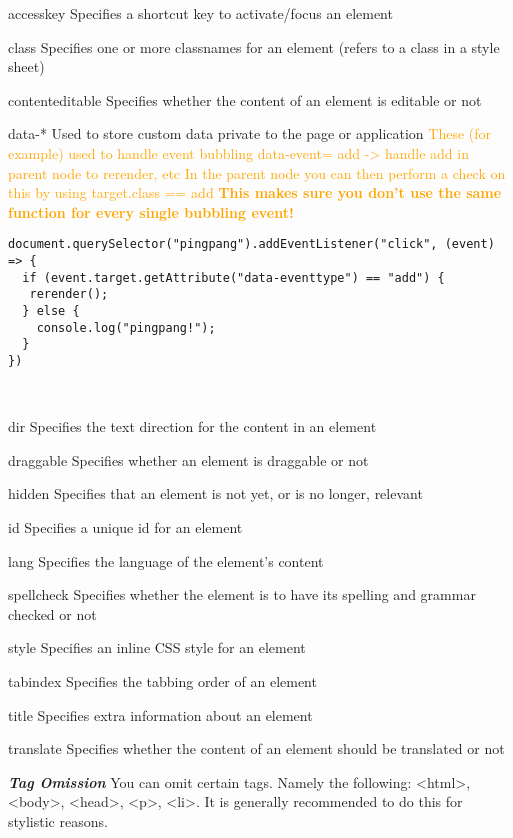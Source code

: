 \documentclass[main.tex,fontsize=6pt,paper=a4,paper=landscape,DIV=calc,]{scrartcl}
\begin{document}
\begin{multicols*}{4}
accesskey  Specifies a shortcut key to activate/focus an element

class  Specifies one or more classnames for an element (refers to a class in a style sheet)

contenteditable  Specifies whether the content of an element is editable or not

data-*  Used to store custom data private to the page or application\newline
\textcolor{orange}{These (for example) used to handle event bubbling\newline 
data-event= add -> handle add in parent node to rerender, etc\newline
In the parent node you can then perform a check on this by using target.class == add\newline
\textbf{This makes sure you don't use the same function for every single bubbling event!}}\newline
\begin{lstlisting}
document.querySelector("pingpang").addEventListener("click", (event) => { 
  if (event.target.getAttribute("data-eventtype") == "add") {
   rerender();
  } else {
    console.log("pingpang!");
  }
})
\end{lstlisting}
\, \newline


dir  Specifies the text direction for the content in an element

draggable  Specifies whether an element is draggable or not

hidden 	Specifies that an element is not yet, or is no longer, relevant

id  Specifies a unique id for an element

lang  Specifies the language of the element's content

spellcheck  Specifies whether the element is to have its spelling and grammar checked or not

style  Specifies an inline CSS style for an element

tabindex  Specifies the tabbing order of an element

title  Specifies extra information about an element

translate  Specifies whether the content of an element should be translated or not

\textbf{\emph{Tag Omission}}  You can omit certain tags. Namely the following: <html>, <body>, <head>, <p>, <li>.\newline
It is generally recommended to do this for stylistic reasons.



\end{multicols*}
\end{document}
